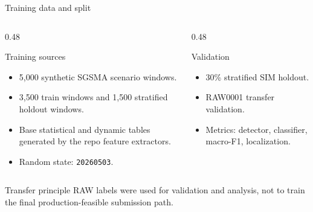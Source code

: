 ﻿\documentclass[10pt,aspectratio=169]{beamer}
\newcommand{\code}[1]{\texttt{\footnotesize #1}}
\begin{document}
\begin{frame}{Training data and split}
\small
\begin{columns}[T,totalwidth=\textwidth]
\begin{column}{0.48\textwidth}
\begin{block}{Training sources}
\begin{itemize}
  \item 5,000 synthetic SGSMA scenario windows.
  \item 3,500 train windows and 1,500 stratified holdout windows.
  \item Base statistical and dynamic tables generated by the repo feature extractors.
  \item Random state: \code{20260503}.
\end{itemize}
\end{block}
\end{column}
\begin{column}{0.48\textwidth}
\begin{exampleblock}{Validation}
\begin{itemize}
  \item 30\% stratified SIM holdout.
  \item RAW0001 transfer validation.
  \item Metrics: detector, classifier, macro-F1, localization.
\end{itemize}
\end{exampleblock}
\end{column}
\end{columns}
\vspace{2mm}
\begin{alertblock}{Transfer principle}
RAW labels were used for validation and analysis, not to train the final production-feasible submission path.
\end{alertblock}
\end{frame}
\end{document}
